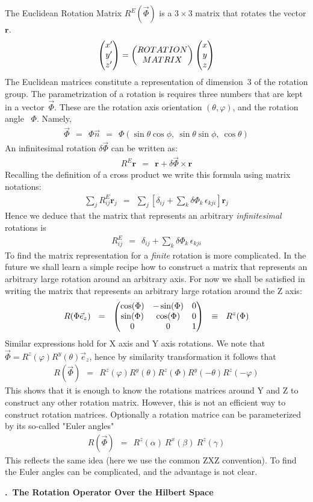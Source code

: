 \documentclass[onecolumn,fleqn, 11pt]{revtex4}
\newcommand{\amatrix}[1]{\begin{matrix} #1 \end{matrix}}
\newcommand{\beq}{\begin{eqnarray}}
\newcommand{\eeq}{\end{eqnarray}}
\renewcommand{\thesubsection}{\arabic{subsection}}
\renewcommand{\thesubsubsection}{\arabic{subsubsection}}
\newcommand{\sheadC}[1]
{
\addtocounter{subsubsection}{1}
\vspace{5mm}
{\bf \thesubsection.\thesubsubsection \ #1}  
\nopagebreak
\phantomsection
}
\begin{document}
The Euclidean Rotation Matrix ${R^E(\vec{\Phi})}$ 
is a ${3\times3}$ matrix that rotates the vector ${\mathbf{r}}$.
\beq
\left( \amatrix{x' \cr y' \cr z'} \right) 
= \left( \amatrix{ROTATION \cr MATRIX} \right) \left( \amatrix{x \cr y \cr z} \right) 
\eeq
The Euclidean matrices constitute  
a representation of dimension~$3$
of the rotation group.
The parametrization of a rotation 
is requires three numbers that are kept in a vector~${\vec{\Phi}}$. 
These are the rotation axis orientation $(\theta, \varphi)$, 
and the rotation angle~ ${ \Phi }$. Namely, 
\beq
\vec{\Phi} \ \ =  \ \ \Phi\vec{n} \ \ = \ \ \Phi(\sin\theta\cos\phi,\ \sin\theta\sin\phi,\ \cos\theta) 
\eeq
An infinitesimal rotation $\delta \vec{\Phi}$ can be written as:
\beq
R^E \mathbf{r} \ \ = \ \ \mathbf{r}+ \delta \vec{\Phi} \times \mathbf{r} 
\eeq
Recalling the definition of a cross product we write 
this formula using matrix notations:
\beq
\sum_j R^E_{ij} \mathbf{r}_j \ \ = \ \ 
\sum_j \left[ 
\delta_{ij} + \sum_k \delta\Phi_k \, \epsilon_{kji}
\right] \mathbf{r}_j 
\eeq
Hence we deduce that the matrix that represents 
an arbitrary {\em infinitesimal} rotations is   
\beq
R^E_{ij} \ \ = \ \ \delta_{ij} + \sum_k \delta\Phi_k \, \epsilon_{kji}
\eeq
To find the matrix representation for a {\em finite} rotation 
is more complicated. In the future we shall learn a simple 
recipe how to construct a matrix that represents 
an arbitrary large rotation around an arbitrary axis. 
For now we shall be satisfied in writing the matrix that represents 
an arbitrary large rotation around the Z axis:
\beq
R(\Phi\vec{e}_z)
\ \ = \ \ \left(\amatrix{ 
\cos(\Phi) & -\sin(\Phi) & 0 \cr 
\sin(\Phi) & \cos(\Phi) & 0 \cr 
0 & 0 & 1 }  
\right) 
\ \ \equiv \ \ R^z(\Phi) 
\eeq
Similar expressions hold for X axis and Y axis rotations.
We note that $\vec{\Phi}=R^z(\varphi) R^y(\theta)\vec{e}_z$, 
hence by similarity transformation it follows that    
\beq
R(\vec{\Phi}) \ \ = \ \ R^z(\varphi) R^y(\theta) R^z(\Phi) R^y(-\theta) R^z(-\varphi)
\eeq
This shows that it is enough to know the rotations matrices 
around Y and Z to construct any other rotation matrix.  
However, this is not an efficient way to construct rotation matrices. 
Optionally a rotation matrice can be parameterized by its 
so-called "Euler angles" 
\beq
R(\vec{\Phi}) \ \ = \ \ R^z(\alpha) \ R^x(\beta) \ R^z(\gamma)
\eeq
This reflects the same idea (here we use the common ZXZ convention). 
To find the Euler angles can be complicated, and the advantage is not clear.


\sheadC{The Rotation Operator Over the Hilbert Space}
\end{document}
